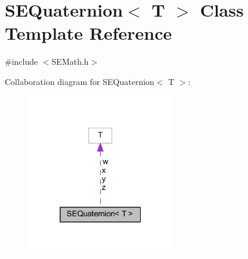 \section{S\+E\+Quaternion$<$ T $>$ Class Template Reference}
\label{class_s_e_quaternion}


{\ttfamily \#include $<$S\+E\+Math.\+h$>$}



Collaboration diagram for S\+E\+Quaternion$<$ T $>$\+:
\nopagebreak
\begin{figure}[H]
\begin{center}
\leavevmode
\includegraphics[width=181pt]{class_s_e_quaternion__coll__graph}
\end{center}
\end{figure}
